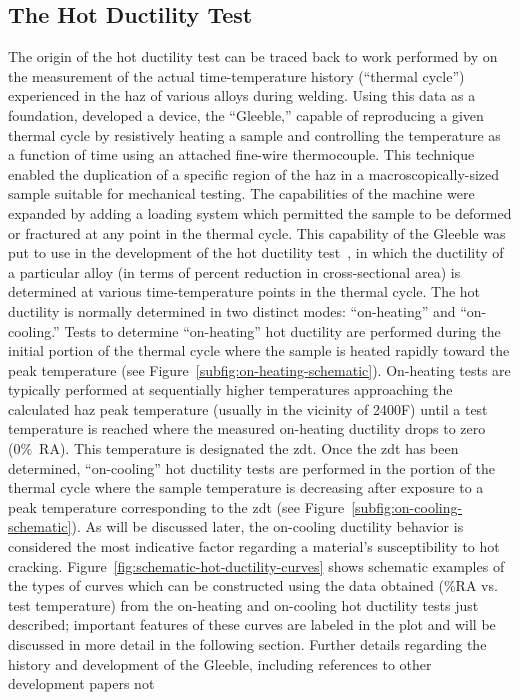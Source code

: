 \subsection{The Hot Ductility Test}
The origin of the hot ductility test can be traced back to work performed by \citet{nippes_cooling_1949} on the measurement of the actual time-temperature history (“thermal cycle”) experienced in the \gls{haz} of various alloys during welding.  Using this data as a foundation, \citet{nippes_development_1949} developed a device, the “Gleeble,” capable of reproducing a given thermal cycle by resistively heating a sample and controlling the temperature as a function of time using an attached fine-wire thermocouple. This technique enabled the duplication of a specific region of the \gls{haz} in a macroscopically-sized sample suitable for mechanical testing.  The capabilities of the machine were expanded by adding a loading system which permitted the sample to be deformed or fractured at any point in the thermal cycle.  This capability of the Gleeble\textregistered{} was put to use in the development of the hot ductility test~\cite{nippes_investigation_1955}, in which the ductility of a particular alloy (in terms of percent reduction in cross-sectional area) is determined at various time-temperature points in the thermal cycle.  The hot ductility is normally determined in two distinct modes: “on-heating” and “on-cooling.”  Tests to determine “on-heating” hot ductility are performed during the initial portion of the thermal cycle where the sample is heated rapidly toward the peak temperature (see Figure~\ref{subfig:on-heating-schematic}).  On-heating tests are typically performed at sequentially higher temperatures approaching the calculated \gls{haz} peak temperature (usually in the vicinity of 2400\textdegree{}F) until a test temperature is reached where the measured on-heating ductility drops to zero (0\%~RA).  This temperature is designated the \gls{zdt}.  Once the \gls{zdt} has been determined, “on-cooling” hot ductility tests are performed in the portion of the thermal cycle where the sample temperature is decreasing after exposure to a peak temperature corresponding to the \gls{zdt} (see Figure~\ref{subfig:on-cooling-schematic}).  As will be discussed later, the on-cooling ductility behavior is considered the most indicative factor regarding a material’s susceptibility to hot cracking.  Figure~\ref{fig:schematic-hot-ductility-curves} shows schematic examples of the types of curves which can be constructed using the data obtained (\%RA vs. test temperature) from the on-heating and on-cooling hot ductility tests just described; important features of these curves are labeled in the plot and will be discussed in more detail in the following section. Further details regarding the history and development of the Gleeble, including references to other development papers not 
